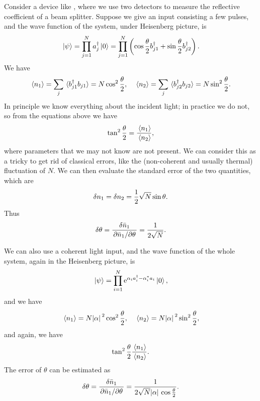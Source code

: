 \documentclass[hyperref, a4paper]{article}
\newcommand*{\ee}{\mathrm{e}}
\begin{document}
Consider a device like , where we use two detectors to measure the reflective coefficient of a beam splitter.
Suppose we give an input consisting a few pulses, and the wave function of the system, under Heisenberg picture, is
\begin{equation}
    \ket*{\psi} = \prod_{j=1}^N a_j^\dagger \ket*{0} = \prod_{j=1}^N \left( \cos\frac{\theta}{2} b_{j1}^\dagger + \sin\frac{\theta}{2} b_{j2}^\dagger \right) .
\end{equation}
We have 
\begin{equation}
    \expval*{n_1} = \sum_j \expval*{b_{j1}^\dagger b_{j1}} = N \cos^2\frac{\theta}{2}, \quad \expval*{n_2} = \sum_j \expval*{b_{j2}^\dagger b_{j2}} = N \sin^2\frac{\theta}{2}.
\end{equation}
In principle we know everything about the incident light; in practice we do not, so from the equations above we have 
\begin{equation}
    \tan^2 \frac{\theta}{2} = \frac{\expval*{n_1}}{\expval*{n_2}},
\end{equation}
where parameters that we may not know are not present.
We can consider this as a tricky to get rid of classical errors, like the (non-coherent and usually thermal) fluctuation of $N$.
We can then evaluate the standard error of the two quantities, which are 
\begin{equation}
    \var{n}_1 = \var{n_2} = \frac{1}{2} \sqrt{N} \sin \theta.
\end{equation}
Thus 
\begin{equation}
    \var{\theta} = \frac{\var{\bar{n}}_1}{\pdv*{\bar{n}_1}{\theta}} = \frac{1}{2 \sqrt{N}}.
\end{equation}

We can also use a coherent light input, and the wave function of the whole system, again in the Heisenberg picture, is 
\begin{equation}
    \ket*{\psi} = \prod_{i=1}^N \ee^{\alpha_i a^\dagger_i - \alpha_i^* a_i} \ket*{0},
\end{equation}
and we have 
\begin{equation}
    \expval*{n_1} = N \abs*{\alpha}^2 \cos^2 \frac{\theta}{2}, \quad \expval*{n_2} = N \abs*{\alpha}^2 \sin^2 \frac{\theta}{2},
\end{equation}
and again, we have 
\begin{equation}
    \tan^2 \frac{\theta}{2} \frac{\expval*{n_1}}{\expval*{n_2}}.
\end{equation}
The error of $\theta$ can be estimated as 
\begin{equation}
    \var{\theta} = \frac{\var{\bar{n}}_1}{\pdv*{\bar{n}_1}{\theta}} = \frac{1}{2 \sqrt{N} \abs*{\alpha} \cos \frac{\theta}{2}}.
\end{equation}
\end{document}
